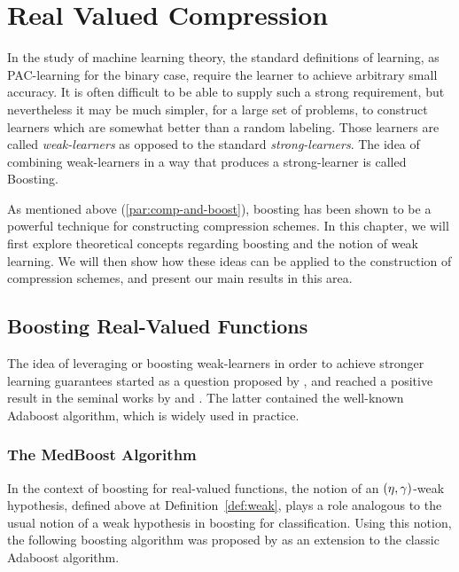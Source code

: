 \documentclass[12pt,a4paper,oneside,onecolumn]{book}
\begin{document}
\chapter{Real Valued Compression}

In the study of machine learning theory,
the standard definitions of learning,
as PAC-learning for the binary case,
require the learner to achieve arbitrary small accuracy.
It is often difficult to be able to supply such a strong requirement,
but nevertheless it may be much simpler,
for a large set of problems,
to construct learners which are somewhat
better than a random labeling.
Those learners are called \emph{weak-learners} as opposed
to the standard \emph{strong-learners}.
The idea of combining weak-learners in a way that produces a strong-learner is called Boosting. 

As mentioned above (\ref{par:comp-and-boost}), boosting has been shown to be a powerful technique for constructing compression schemes. In this chapter, we will first explore theoretical concepts regarding boosting and the notion of weak learning. We will then show how these ideas can be applied to the construction of compression schemes, and present our main results in this area. 

\section{Boosting Real-Valued Functions}
\label{subsec:real-boosting}


The idea of leveraging or boosting weak-learners in order to achieve
stronger learning guarantees started as a question
proposed by \citeauthor{k-thb-88},
and reached a positive result in the seminal works
by \cite{DBLP:journals/ml/Schapire90}
and \cite{FreundSchapire97}.
The latter contained the well-known Adaboost algorithm,
which is widely used in practice.





\subsection{The MedBoost Algorithm}

In the context of boosting for real-valued functions, 
the notion of an $(\eta,\gamma)$-weak hypothesis, defined above at Definition~\ref{def:weak}, plays a role analogous to the usual notion of a weak hypothesis in boosting for classification.
Using this notion, the following boosting algorithm was proposed by \citet{kegl2003robust}
as an extension to the classic Adaboost algorithm.
\end{document}
